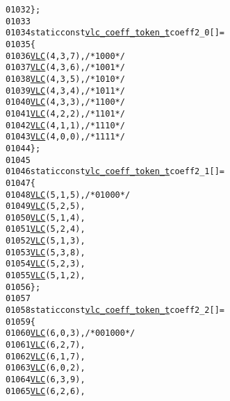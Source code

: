\begin{footnotesize}
\begin{alltt}
01032 \};
01033 
01034 \textcolor{keyword}{static} \textcolor{keyword}{const} \hyperlink{structvlc__coeff__token__t}{vlc_coeff_token_t} coeff2\_0[] = 
01035 \{
01036         \hyperlink{vlc_8h_a7f3572774a720fd9b4bc3b1a0b65082f}{VLC}(4, 3, 7),   \textcolor{comment}{/* 1000 */}
01037         \hyperlink{vlc_8h_a7f3572774a720fd9b4bc3b1a0b65082f}{VLC}(4, 3, 6),   \textcolor{comment}{/* 1001 */}
01038         \hyperlink{vlc_8h_a7f3572774a720fd9b4bc3b1a0b65082f}{VLC}(4, 3, 5),   \textcolor{comment}{/* 1010 */}
01039         \hyperlink{vlc_8h_a7f3572774a720fd9b4bc3b1a0b65082f}{VLC}(4, 3, 4),   \textcolor{comment}{/* 1011 */}
01040         \hyperlink{vlc_8h_a7f3572774a720fd9b4bc3b1a0b65082f}{VLC}(4, 3, 3),   \textcolor{comment}{/* 1100 */}
01041         \hyperlink{vlc_8h_a7f3572774a720fd9b4bc3b1a0b65082f}{VLC}(4, 2, 2),   \textcolor{comment}{/* 1101 */}
01042         \hyperlink{vlc_8h_a7f3572774a720fd9b4bc3b1a0b65082f}{VLC}(4, 1, 1),   \textcolor{comment}{/* 1110 */}
01043         \hyperlink{vlc_8h_a7f3572774a720fd9b4bc3b1a0b65082f}{VLC}(4, 0, 0),   \textcolor{comment}{/* 1111 */}
01044 \};
01045 
01046 \textcolor{keyword}{static} \textcolor{keyword}{const} \hyperlink{structvlc__coeff__token__t}{vlc_coeff_token_t} coeff2\_1[] = 
01047 \{
01048         \hyperlink{vlc_8h_a7f3572774a720fd9b4bc3b1a0b65082f}{VLC}(5, 1, 5),   \textcolor{comment}{/* 0100 0 */}
01049         \hyperlink{vlc_8h_a7f3572774a720fd9b4bc3b1a0b65082f}{VLC}(5, 2, 5),
01050         \hyperlink{vlc_8h_a7f3572774a720fd9b4bc3b1a0b65082f}{VLC}(5, 1, 4),
01051         \hyperlink{vlc_8h_a7f3572774a720fd9b4bc3b1a0b65082f}{VLC}(5, 2, 4),
01052         \hyperlink{vlc_8h_a7f3572774a720fd9b4bc3b1a0b65082f}{VLC}(5, 1, 3),
01053         \hyperlink{vlc_8h_a7f3572774a720fd9b4bc3b1a0b65082f}{VLC}(5, 3, 8),
01054         \hyperlink{vlc_8h_a7f3572774a720fd9b4bc3b1a0b65082f}{VLC}(5, 2, 3),
01055         \hyperlink{vlc_8h_a7f3572774a720fd9b4bc3b1a0b65082f}{VLC}(5, 1, 2),
01056 \};
01057 
01058 \textcolor{keyword}{static} \textcolor{keyword}{const} \hyperlink{structvlc__coeff__token__t}{vlc_coeff_token_t} coeff2\_2[] = 
01059 \{
01060         \hyperlink{vlc_8h_a7f3572774a720fd9b4bc3b1a0b65082f}{VLC}(6, 0, 3),   \textcolor{comment}{/* 0010 00 */}
01061         \hyperlink{vlc_8h_a7f3572774a720fd9b4bc3b1a0b65082f}{VLC}(6, 2, 7),
01062         \hyperlink{vlc_8h_a7f3572774a720fd9b4bc3b1a0b65082f}{VLC}(6, 1, 7),
01063         \hyperlink{vlc_8h_a7f3572774a720fd9b4bc3b1a0b65082f}{VLC}(6, 0, 2),
01064         \hyperlink{vlc_8h_a7f3572774a720fd9b4bc3b1a0b65082f}{VLC}(6, 3, 9),
01065         \hyperlink{vlc_8h_a7f3572774a720fd9b4bc3b1a0b65082f}{VLC}(6, 2, 6),

\end{alltt}
\end{footnotesize}
